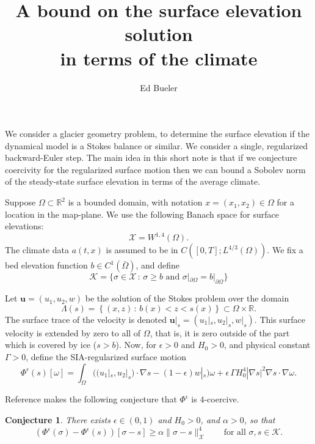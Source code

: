 \documentclass[12pt]{article}
\title{A bound on the surface elevation solution \\ in terms of the climate}
\author{Ed Bueler}
\newtheorem{conjecture}{Conjecture}
\newcommand{\RR}{\ensuremath{\mathbb R}}
\newcommand{\bu}{\ensuremath{\mathbf{u}}}
\newcommand{\cK}{\ensuremath{\mathcal{K}}}
\newcommand{\cX}{\ensuremath{\mathcal{X}}}
\newcommand{\grad}{\ensuremath{\nabla}}
\newcommand{\eps}{\ensuremath{\epsilon}}
\begin{document}
\maketitle

We consider a glacier geometry problem, to determine the surface elevation if the dynamical model is a Stokes balance or similar.  We consider a single, regularized backward-Euler step.  The main idea in this short note is that if we conjecture coercivity for the regularized surface motion then we can bound a Sobolev norm of the steady-state surface elevation in terms of the average climate.

Suppose $\Omega\subset \RR^2$ is a bounded domain, with notation $x=(x_1,x_2)\in\Omega$ for a location in the map-plane.  We use the following Banach space for surface elevations:
\begin{equation}
\cX = W^{1,4}(\Omega). \label{eq:defineX}
\end{equation}
The climate data $a(t,x)$ is assumed to be in $C([0,T]; L^{4/3}(\Omega))$.  We fix a bed elevation function $b\in C^1(\bar\Omega)$, and define
\begin{equation}
\cK=\{\sigma\in\cX\,:\,\sigma\ge b \text{ and } \sigma|_{\partial\Omega}=b|_{\partial\Omega}\} \label{eq:defineK}
\end{equation}

Let $\bu=(u_1,u_2,w)$ be the solution of the Stokes problem over the domain
\begin{equation}
\Lambda(s) = \left\{(x,z)\,:\,b(x) < z < s(x)\right\} \subset \Omega \times \RR. \label{eq:domainfroms}
\end{equation}
The surface trace of the velocity is denoted $\bu|_s=(u_1|_s,u_2|_s,w|_s)$.  This surface velocity is extended by zero to all of $\Omega$, that is, it is zero outside of the part which is covered by ice ($s>b$).  Now, for $\eps>0$ and $H_0>0$, and physical constant $\Gamma>0$, define the SIA-regularized surface motion
\begin{equation}
\Phi^\eps(s)[\omega] = \int_\Omega \Big(\big(u_1|_s,u_2|_s\big) \cdot \grad s - (1-\eps) w|_s\Big) \omega + \eps\, \Gamma H_0^4 |\grad s|^2 \grad s \cdot \grad \omega. \label{eq:defineregularizedPhi}
\end{equation}

Reference \cite{Bueler2025} makes the following conjecture that $\Phi^\eps$ is $4$-coercive.

\begin{conjecture} \label{conj:regcoercive}  There exists $\eps \in (0,1)$ and $H_0>0$, and $\alpha>0$, so that
\begin{equation}
\left(\Phi^\eps(\sigma) - \Phi^\eps(s)\right)[\sigma-s] \ge \alpha \|\sigma-s\|_{\cX}^4 \qquad \text{for all } \sigma,s\in\cK. \label{eq:regcoercive}
\end{equation}
\end{conjecture}
\end{document}
